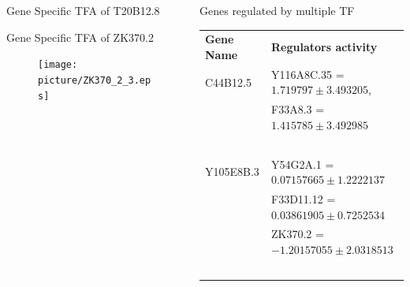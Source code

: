\documentclass[serif,mathserif,final]{beamer}
\begin{document}
\begin{frame}{}
\begin{columns}[t]
\begin{column}{0.24\linewidth}
\begin{block}{Gene Specific TFA of T20B12.8}
      \end{block}

      
      \begin{block}{Gene Specific TFA of ZK370.2}
      
      \begin{figure}
      \texttt{[image: picture/ZK370\_2\_3.eps]}
      \end{figure}

      \end{block}
       
            
    \end{column}%

    
    \begin{column}{0.24\linewidth}

      
            \begin{block}{Genes regulated by multiple TF}
             
        \begin{table}
	  \begin{tabular}{l l }
	      \textbf{Gene Name} & \textbf{Regulators activity} \\
	      {\color{red}C44B12.5} & {\color{blue} Y116A8C.35 }= $ 1.719797 \pm 3.493205 $, \\ 
				    & {\color{blue}F33A8.3} = $ 1.415785 \pm 3.492985$ \\~\\

		{\color{red}Y105E8B.3} & {\color{blue} Y54G2A.1} = $ 0.07157665 \pm 1.2222137 $ \\
		  & {\color{blue} F33D11.12} = $ 0.03861905 \pm 0.7252534 $ \\
 		  & {\color{blue} ZK370.2} = $ -1.20157055 \pm  2.0318513 $\\~\\
		    

\end{tabular}
\end{table}
\end{block}
\end{column}
\end{columns}
\end{frame}
\end{document}
